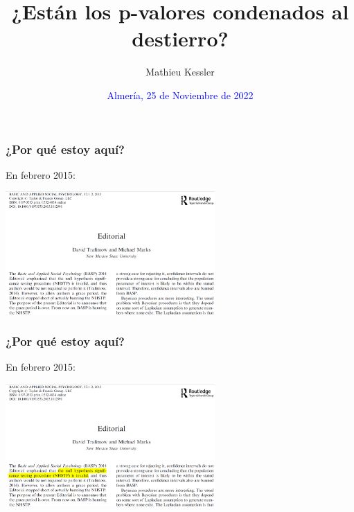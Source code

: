 \documentclass[9pt]{beamer}
\begin{document}
\title{¿Están los p-valores condenados al destierro?}

\author[Mathieu Kessler]{Mathieu Kessler}
\date{\textcolor{blue}{Almería, 25 de Noviembre de 2022}}

\begin{frame}
  \titlepage
\end{frame}
\begin{frame}
  \frametitle{¿Por qué estoy aquí?}
  \begin{overlayarea}{\textwidth}{\textheight}
    En febrero 2015:
    \begin{center}
      \includegraphics[width=8cm]{images/ban_editorial_0.png}
    \end{center}

  \end{overlayarea}
\end{frame}
\begin{frame}
  \frametitle{¿Por qué estoy aquí?}
  \begin{overlayarea}{\textwidth}{\textheight}
    En febrero 2015:
    \begin{center}
      \includegraphics[width=8cm]{images/ban_editorial_1.png}
    \end{center}
  \end{overlayarea}
\end{frame}
\end{document}

